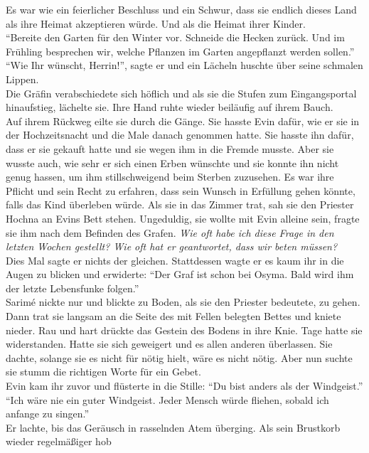 Es war wie ein feierlicher Beschluss und ein Schwur, dass sie endlich dieses Land als ihre Heimat 
akzeptieren würde. Und als die Heimat ihrer Kinder.\\
``Bereite den Garten für den Winter vor. Schneide die Hecken zurück. Und im Frühling besprechen 
wir, welche Pflanzen im Garten angepflanzt werden sollen.''\\
``Wie Ihr wünscht, Herrin!'', sagte er und ein Lächeln huschte über seine schmalen Lippen.\\
Die Gräfin verabschiedete sich höflich und als sie die Stufen zum Eingangsportal hinaufstieg, 
lächelte sie. Ihre Hand ruhte wieder beiläufig auf ihrem Bauch. \\

Auf ihrem Rückweg eilte sie durch die Gänge. Sie hasste Evin dafür, wie er sie in der 
Hochzeitsnacht und die Male danach genommen hatte. Sie hasste ihn dafür, dass er sie gekauft hatte 
und sie wegen ihm in die Fremde musste. Aber sie wusste auch, wie sehr er sich einen Erben wünschte 
und sie konnte ihn nicht genug hassen, um ihm stillschweigend beim Sterben zuzusehen. Es war ihre 
Pflicht und sein Recht zu erfahren, dass sein Wunsch in Erfüllung gehen könnte, falls das Kind 
überleben würde. Als sie in das Zimmer trat, sah sie den Priester Hochna an Evins Bett stehen. 
Ungeduldig, sie wollte mit Evin alleine sein, fragte sie ihm nach dem Befinden des Grafen. 
\textit{Wie oft habe ich diese Frage in den letzten Wochen gestellt? Wie oft hat er geantwortet, 
dass wir beten müssen?}\\
Dies Mal sagte er nichts der gleichen. Stattdessen wagte er es kaum ihr in die Augen zu blicken und 
erwiderte: ``Der Graf ist schon bei Osyma. Bald wird ihm der letzte Lebensfunke folgen.''\\
Sarimé nickte nur und blickte zu Boden, als sie den Priester bedeutete, zu gehen. Dann trat sie 
langsam an die Seite des mit Fellen belegten Bettes und kniete nieder. Rau und hart drückte das 
Gestein des Bodens in ihre Knie. Tage hatte sie widerstanden. Hatte sie sich geweigert und es allen 
anderen überlassen. Sie dachte, solange sie es nicht für nötig hielt, wäre es nicht nötig. Aber nun 
suchte sie stumm die richtigen Worte für ein Gebet.\\
Evin kam ihr zuvor und flüsterte in die Stille: ``Du bist anders als der Windgeist.''\\
``Ich wäre nie ein guter Windgeist. Jeder Mensch würde fliehen, sobald ich anfange zu singen.''\\
Er lachte, bis das Geräusch in rasselnden Atem überging. Als sein Brustkorb wieder regelmäßiger hob 

